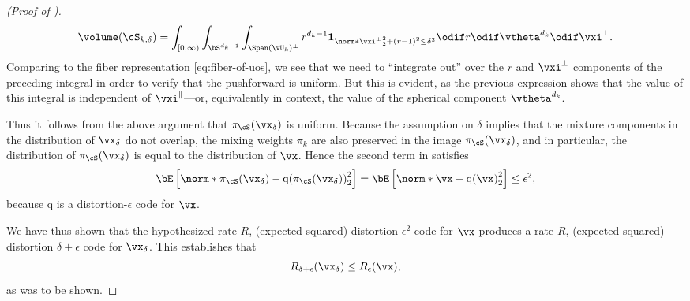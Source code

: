 \documentclass[../../book-main.tex]{subfiles}
\begin{document}
\begin{proof}[(Proof of )]
    \begin{equation}
        \volume(\cS_{k, \delta})
        = \int_{[0, \infty)} \int_{\bS^{d_k-1}} \int_{\Span(\vU_k)^\perp}
        r^{d_k-1}
        \mathbf{1}_{
            \norm*{\vxi^{\perp}}_2^2
            + \left( r - 1 \right)^2
            \leq
            \delta^{2}
        }
        \odif r \odif \vtheta^{d_k} \odif \vxi^{\perp}.
    \end{equation}
    Comparing to the fiber representation \eqref{eq:fiber-of-uos},
    we see that we need to ``integrate out'' over the $r$ and $\vxi^\perp$
    components of the preceding integral in order to verify that the pushforward
    is uniform.
    But this is evident, as the previous expression shows that the value of this
    integral is independent of $\vxi^\|$---or, equivalently in context, the
    value of the spherical component $\vtheta^{d_k}$.

    Thus it follows from the above argument that $\pi_{\cS}(\vx_{\delta})$ is
    uniform.
    Because the assumption on $\delta$ implies that the mixture components in
    the distribution of $\vx_{\delta}$ do not overlap, the mixing weights
    $\pi_k$ are also preserved in the image $\pi_{\cS}(\vx_{\delta})$, and in
    particular, the distribution of $\pi_{\cS}(\vx_{\delta})$ is equal to the
    distribution of $\vx$.
    Hence the second term in  satisfies
    \begin{equation}
        \bE\left[ \norm*{ \pi_{\cS}(\vx_{\delta}) -
        \mathrm{q}(\pi_{\cS}(\vx_{\delta})) }_2^2 \right]
        =
        \bE\left[ \norm*{ \vx - \mathrm{q}(\vx) }_2^2 \right]
        \leq
        \epsilon^2,
    \end{equation}
    because $\mathrm{q}$ is a distortion-$\epsilon$ code for $\vx$.

    We have thus shown that the hypothesized rate-$R$, (expected squared)
    distortion-$\epsilon^2$ code for $\vx$ produces a rate-$R$, (expected
    squared) distortion $\delta + \epsilon$ code for $\vx_{\delta}$.
    This establishes that
    \begin{equation}
        R_{\delta + \epsilon}(\vx_{\delta})
        \leq
        R_{\epsilon}(\vx),
    \end{equation}
    as was to be shown.

\end{proof}
\end{document}
